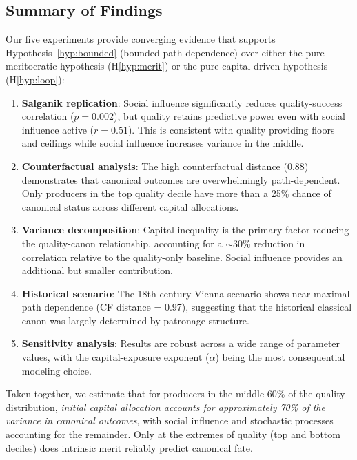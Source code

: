 \documentclass[11pt,a4paper]{article}
\begin{document}
\subsection{Summary of Findings}

Our five experiments provide converging evidence that supports Hypothesis~\ref{hyp:bounded} (bounded path dependence) over either the pure meritocratic hypothesis (H\ref{hyp:merit}) or the pure capital-driven hypothesis (H\ref{hyp:loop}):

\begin{enumerate}
    \item \textbf{Salganik replication}: Social influence significantly reduces quality-success correlation ($p = 0.002$), but quality retains predictive power even with social influence active ($r = 0.51$). This is consistent with quality providing floors and ceilings while social influence increases variance in the middle.

    \item \textbf{Counterfactual analysis}: The high counterfactual distance (0.88) demonstrates that canonical outcomes are overwhelmingly path-dependent. Only producers in the top quality decile have more than a 25\% chance of canonical status across different capital allocations.

    \item \textbf{Variance decomposition}: Capital inequality is the primary factor reducing the quality-canon relationship, accounting for a $\sim$30\% reduction in correlation relative to the quality-only baseline. Social influence provides an additional but smaller contribution.

    \item \textbf{Historical scenario}: The 18th-century Vienna scenario shows near-maximal path dependence (CF distance = 0.97), suggesting that the historical classical canon was largely determined by patronage structure.

    \item \textbf{Sensitivity analysis}: Results are robust across a wide range of parameter values, with the capital-exposure exponent ($\alpha$) being the most consequential modeling choice.
\end{enumerate}

Taken together, we estimate that for producers in the middle 60\% of the quality distribution, \textit{initial capital allocation accounts for approximately 70\% of the variance in canonical outcomes}, with social influence and stochastic processes accounting for the remainder. Only at the extremes of quality (top and bottom deciles) does intrinsic merit reliably predict canonical fate.
\end{document}
